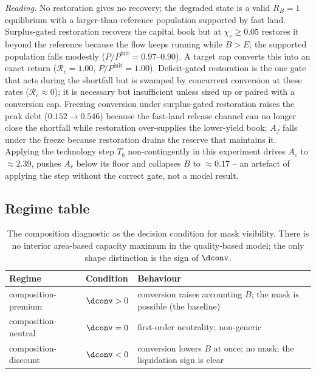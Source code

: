 \noindent\emph{Reading.} No restoration gives no recovery; the degraded state is a valid $R_B=1$ equilibrium with a larger-than-reference population supported by fast land. Surplus-gated restoration recovers the capital book but at $\chi_r\ge0.05$ restores it beyond the reference because the flow keeps running while $B>E$; the supported population falls modestly ($P/P^{\mathrm{init}}=0.97$--$0.90$). A target cap converts this into an exact return ($\mathcal R_c=1.00$, $P/P^{\mathrm{init}}=1.00$). Deficit-gated restoration is the one gate that acts during the shortfall but is swamped by concurrent conversion at these rates ($\mathcal R_c\approx0$); it is necessary but insufficient unless sized up or paired with a conversion cap. Freezing conversion under surplus-gated restoration raises the peak debt ($0.152\to0.546$) because the fast-land release channel can no longer close the shortfall while restoration over-supplies the lower-yield book; $A_f$ falls under the freeze because restoration drains the reserve that maintains it. Applying the technology step $T_b$ non-contingently in this experiment drives $A_c$ to $\approx2.39$, pushes $A_r$ below its floor and collapses $B$ to $\approx0.17$ -- an artefact of applying the step without the correct gate, not a model result.

\subsection{Regime table}\label{si:regimes}

\begin{table}[H]
\centering\small
\caption{The composition diagnostic as the decision condition for mask visibility. There is no interior area-based capacity maximum in the quality-based model; the only shape distinction is the sign of $\dconv$.}
\label{tab:si_regime}
\begin{tabularx}{\textwidth}{l l X}
\toprule
Regime & Condition & Behaviour \\
\midrule
composition-premium & $\dconv>0$ & conversion raises accounting $B$; the mask is possible (the baseline) \\
composition-neutral & $\dconv=0$ & first-order neutrality; non-generic \\
composition-discount & $\dconv<0$ & conversion lowers $B$ at once; no mask; the liquidation sign is clear \\
\bottomrule
\end{tabularx}
\end{table}

